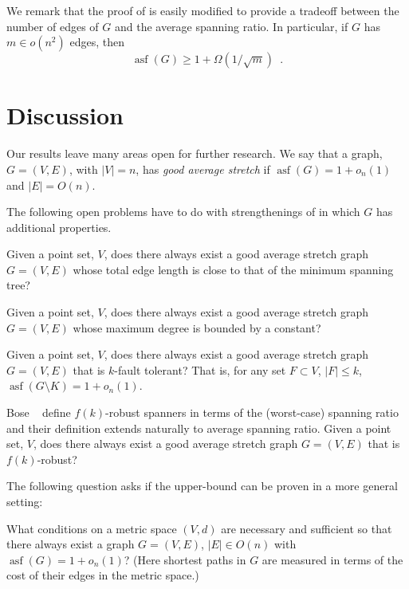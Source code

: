 \documentclass{patmorin}
\DeclareMathOperator{\asf}{asf}
\begin{document}
We remark that the proof of  is easily modified to
provide a tradeoff between the number of edges of $G$ and the average
spanning ratio.  In particular, if $G$ has $m\in o(n^2)$ edges, then
\[
   \asf(G) \ge 1 + \Omega(1/\sqrt{m}) \enspace .
\]

\section{Discussion}

Our results leave many areas open for further research.  We say that
a graph, $G=(V,E)$, with $|V|=n$, has \emph{good average stretch} if
$\asf(G)=1+o_n(1)$ and $|E|=O(n)$.

The following open problems have to do with strengthenings of
 in which $G$ has additional properties.

\begin{op}
  Given a point set, $V$, does there always exist a good average stretch
  graph $G=(V,E)$ whose total edge length is close to that of the minimum
  spanning tree?
\end{op}

\begin{op}
  Given a point set, $V$, does there always exist a good average stretch
  graph $G=(V,E)$ whose maximum degree is bounded by a constant?
\end{op}

\begin{op}
  Given a point set, $V$, does there always exist a good average stretch
  graph $G=(V,E)$ that is $k$-fault tolerant? That is, for any set
  $F\subset V$, $|F|\le k$, $\asf(G\setminus K)=1+o_n(1)$.
\end{op}

\begin{op}
  Bose \etal\ \cite{bose.dujmovic.ea:robust} define $f(k)$-robust spanners in terms of the
  (worst-case) spanning ratio and their definition extends naturally
  to average spanning ratio.  Given a point set, $V$, does there always
  exist a good average stretch graph $G=(V,E)$ that is $f(k)$-robust?
\end{op}


The following question asks if the upper-bound can be proven in a more
general setting:

\begin{op}
  What conditions on a metric space $(V,d)$ are necessary and sufficient
  so that there always exist a graph $G=(V,E)$, $|E|\in O(n)$ with
  $\asf(G)=1+o_n(1)$?  (Here shortest paths in $G$ are measured in terms
  of the cost of their edges in the metric space.)
\end{op}
\end{document}
